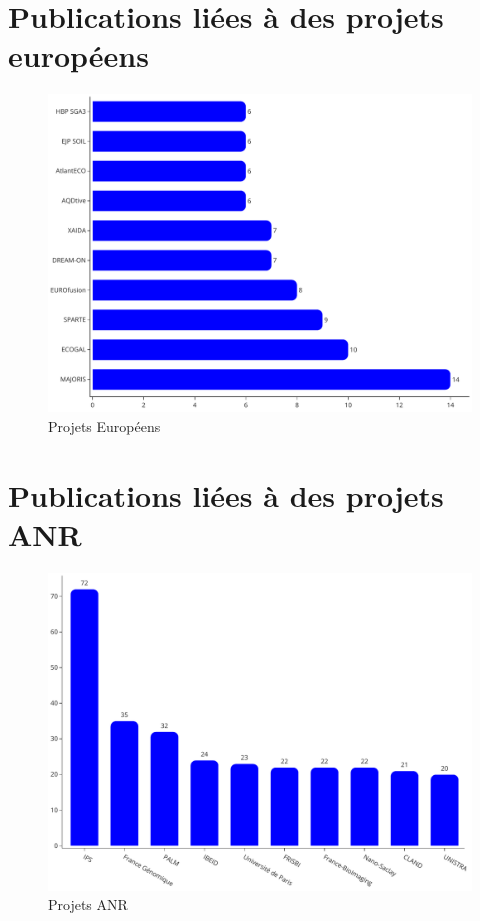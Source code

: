 \documentclass[french, 11pt]{../../dibiso/biso}
\begin{document}






\pagebreak

\section{Publications liées à des projets européens}

\begin{figure}[!h]
  \includegraphics[width=.8\textwidth]{figures/european_projects.pdf}
  \centering
  \caption{Projets Européens}
  \label{fig_eu_projects}
\end{figure}








\section{Publications liées à des projets ANR}

\begin{figure}[!h]
  \includegraphics[width=.8\textwidth]{figures/anr_projects.pdf}
  \centering
  \caption{Projets ANR}
  \label{fig_anr_projects}
\end{figure}
\end{document}
